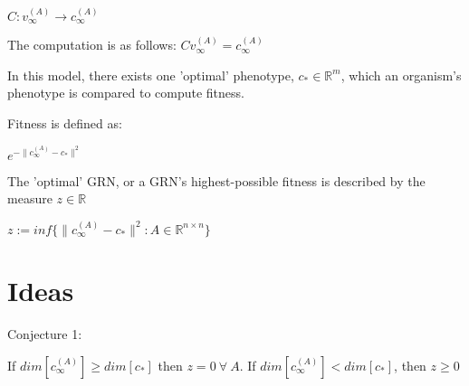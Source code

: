 \documentclass[a4paper,12pt]{article}
\begin{document}
$C: v_{\infty}^{(A)} \rightarrow c^{(A)}_{\infty}$

The computation is as follows: $Cv_{\infty}^{(A)} = c_{\infty}^{(A)}$

In this model, there exists one 'optimal' phenotype, $c_{*} \in \mathbb{R}^{m}$, which an organism's phenotype is compared to compute fitness. 

Fitness is defined as: 

$e^{-\lVert c_{\infty}^{(A)} - c_{*} \rVert^{2}}$

The 'optimal' GRN, or a GRN's highest-possible fitness is described by the measure $z \in \mathbb{R}$

$ z := inf\{\lVert c_{\infty}^{(A)} - c_{*} \rVert^{2}: A \in \mathbb{R}^{n \times n}\}$

\section{Ideas}

Conjecture 1:

 If $dim{[c_{\infty}^{(A)}]} \geq dim{[c_{*}]}$ then $z = 0\ \forall \ A$. If $dim{[c_{\infty}^{(A)}]} <  dim{[c_{*}]}$, then $z \geq 0$
\end{document}
